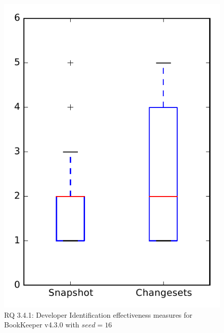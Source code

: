 
\begin{figure}
\centering
\includegraphics[height=0.4\textheight]{figures/dit_seed/rq1_bookkeeper_16}
\caption{RQ 3.4.1: Developer Identification effectiveness measures for BookKeeper v4.3.0 with $seed=16$}
\label{fig:dit_seed:rq1:bookkeeper}
\end{figure}
